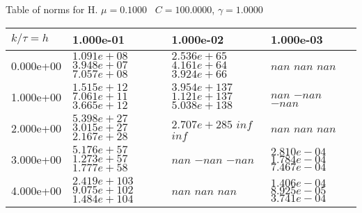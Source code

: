 \begin{center}
Table of norms for H. $\mu = 0.1000$ \, $C = 100.0000$, $\gamma = 1.0000$
  
\begin{tabular}{|p{1in}|p{1in}|p{1in}|p{1in}|} \hline
$k / \tau = h$ &1.000e-01 &1.000e-02 &1.000e-03 \\ \hline 
0.000e+00 & $1.091e+08$  $3.948e+07$  $7.057e+08$  & $2.536e+65$  $4.161e+64$  $3.924e+66$  & $nan$  $nan$  $nan$  \\ \hline 
1.000e+00 & $1.515e+12$  $7.061e+11$  $3.665e+12$  & $3.954e+137$  $1.121e+137$  $5.038e+138$  & $nan$  $-nan$  $-nan$  \\ \hline 
2.000e+00 & $5.398e+27$  $3.015e+27$  $2.167e+28$  & $2.707e+285$  $inf$  $inf$  & $nan$  $nan$  $nan$  \\ \hline 
3.000e+00 & $5.176e+57$  $1.273e+57$  $1.777e+58$  & $nan$  $-nan$  $-nan$  & $2.810e-04$  $1.784e-04$  $7.467e-04$  \\ \hline 
4.000e+00 & $2.419e+103$  $9.075e+102$  $1.484e+104$  & $nan$  $nan$  $nan$  & $1.406e-04$  $8.925e-05$  $3.741e-04$  \\ \hline 

\end{tabular}\\[20pt]
\end{center}
